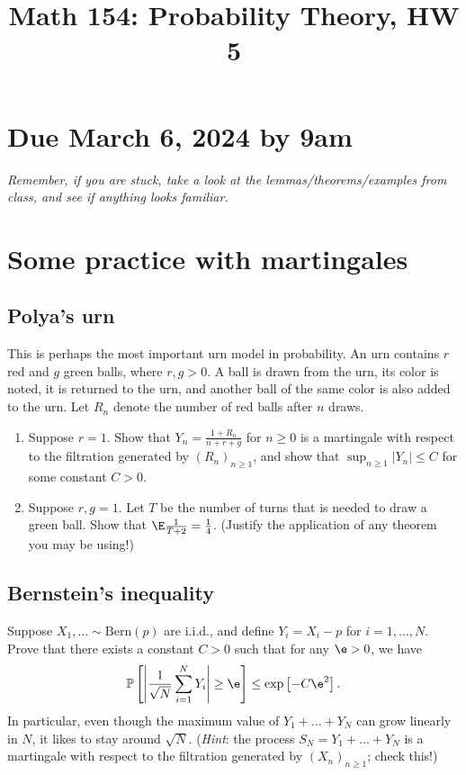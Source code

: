 \documentclass[12pt,reqno]{amsart}
\title{\Large Math 154: Probability Theory, HW 5\vspace{-0.1cm}}
\theoremstyle{definition}
\theoremstyle{remark}
\numberwithin{equation}{section}
\newenvironment{nouppercase}{%
  \let\uppercase\relax%
  \renewcommand{\uppercasenonmath}[1]{}}{}
\begin{document}
\begin{nouppercase}
\maketitle
\end{nouppercase}
\section*{Due March 6, 2024 by 9am}
\emph{Remember, if you are stuck, take a look at the lemmas/theorems/examples from class, and see if anything looks familiar.}
\section{Some practice with martingales}
\subsection{Polya's urn}
This is perhaps the most important urn model in probability. An urn contains $r$ red and $g$ green balls, where $r,g>0$. A ball is drawn from the urn, its color is noted, it is returned to the urn, and another ball of the same color is also added to the urn. Let $R_{n}$ denote the number of red balls after $n$ draws.
\begin{enumerate}
\item Suppose $r=1$. Show that $Y_{n}=\frac{1+R_{n}}{n+r+g}$ for $n\geq0$ is a martingale with respect to the filtration generated by $(R_{n})_{n\geq1}$, and show that $\sup_{n\geq1}|Y_{n}|\leq C$ for some constant $C>0$.
\item Suppose $r,g=1$. Let $T$ be the number of turns that is needed to draw a green ball. Show that $\E\frac{1}{T+2}=\frac14$. (Justify the application of any theorem you may be using!)
\end{enumerate}
\subsection{Bernstein's inequality}\label{subsection:bernstein}
Suppose $X_{1},\ldots\sim\mathrm{Bern}(p)$ are i.i.d., and define $Y_{i}=X_{i}-p$ for $i=1,\ldots,N$. Prove that there exists a constant $C>0$ such that for any $\e>0$, we have 
%
\begin{align*}
\mathbb{P}\left[\left|\frac{1}{\sqrt{N}}\sum_{i=1}^{N}Y_{i}\right|\geq \e\right]\leq \exp\left[-C\e^{2}\right].
\end{align*}
%
In particular, even though the maximum value of $Y_{1}+\ldots+Y_{N}$ can grow linearly in $N$, it likes to stay around $\sqrt{N}$. (\emph{Hint}: the process $S_{N}=Y_{1}+\ldots+Y_{N}$ is a martingale with respect to the filtration generated by $(X_{n})_{n\geq1}$; check this!)
\end{document}
